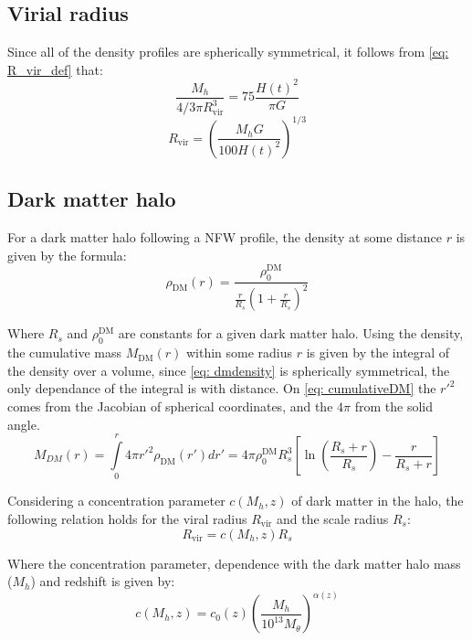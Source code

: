 	\subsection{Virial radius}
		Since all of the density profiles are spherically symmetrical, it follows from \autoref{eq: R_vir_def} that:  
		\begin{equation}
			\dfrac{M_h}{4/3\pi R_\text{vir}^3} = 75\dfrac{H(t)^2}{\pi G}
		\end{equation}
		\begin{equation}
			R_\text{vir} = \left({\dfrac{M_hG}{100 H(t)^2}}\right)^{1/3}
		\end{equation}
	
	\subsection{Dark matter halo}
		For a dark matter halo following a NFW profile, the density at some distance $r$ is given by the formula:
		\begin{equation}\label{eq: dmdensity}
			\rho_\text{DM}(r) = \dfrac{\rho_0^\text{DM}}{\frac{r}{R_s}\left(1 + \frac{r}{R_s}\right)^2}
		\end{equation}
		
		Where $R_s$ and $\rho_0^\text{DM}$ are constants for a given dark matter halo. Using the density, the cumulative mass $M_\text{DM}(r)$ within some radius $r$ is given by the integral of the density over a volume, since \autoref{eq: dmdensity} is spherically symmetrical, the only dependance of the integral is with distance. On \autoref{eq: cumulativeDM} the $r'^2$ comes from the Jacobian of spherical coordinates, and the $4\pi$ from the solid angle.
		\begin{equation}\label{eq: cumulativeDM}
			M_{DM}(r) = \int\limits_0^{r} 4\pi {r'}^2\rho_\text{DM}(r')dr' = 4\pi\rho_0^\text{DM}R_s^3\left[\ln\left(\dfrac{R_s + r}{R_s}\right) - \dfrac{r}{R_s + r}\right]
		\end{equation}
		
		Considering a concentration parameter $c(M_h, z)$ of dark matter in the halo, the following relation holds for the viral radius $R_\text{vir}$ and the scale radius $R_s$:
		\begin{equation}\label{eq: virialConcentration}
			R_\text{vir} = c(M_h, z)R_s
		\end{equation}
		
		Where the concentration parameter, dependence with the dark matter halo mass ($M_h$) and redshift is given by: 
		\begin{equation}
			c(M_h, z) = c_0(z)\left(\dfrac{M_h}{10^{13}M_\theta}\right)^{\alpha(z)}
		\end{equation}
		
